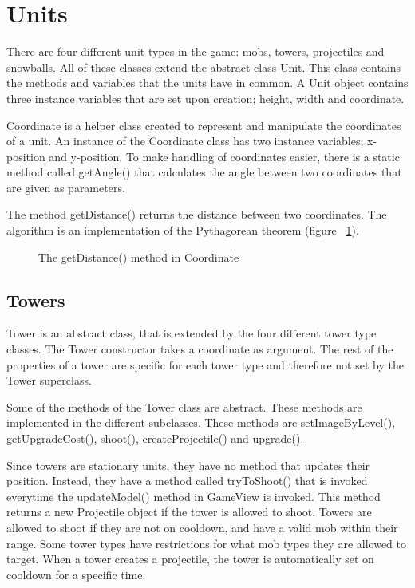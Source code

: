 \section{Units}

There are four different unit types in the game: mobs, towers, projectiles and snowballs. All of these classes extend the abstract class Unit. This class contains the methods and variables that the units have in common. A Unit object contains three instance variables that are set upon creation; height, width and coordinate.

Coordinate is a helper class created to represent and manipulate the coordinates of a unit. An instance of the Coordinate class has two instance variables; x-position and y-position. To make handling of coordinates easier, there is a static method called getAngle() that calculates the angle between two coordinates that are given as parameters.

The method getDistance() returns the distance between two coordinates. The algorithm is an implementation of the Pythagorean theorem (figure ~\ref{fig:codeExGetDistance}).

\begin{figure}[htb]
\begin{small}

\end{small}
\caption{The getDistance() method in Coordinate}
\label{fig:codeExGetDistance}
\end{figure}

\subsection{Towers}

Tower is an abstract class, that is extended by the four different tower type classes. The Tower constructor takes a coordinate as argument. The rest of the properties of a tower are specific for each tower type and therefore not set by the Tower superclass. 

Some of the methods of the Tower class are abstract. These methods are implemented in the different subclasses. These methods are setImageByLevel(), getUpgradeCost(), shoot(), createProjectile() and upgrade(). 

Since towers are stationary units, they have no method that updates their position. Instead, they have a method called tryToShoot() that is invoked everytime the updateModel() method in GameView is invoked. This method returns a new Projectile object if the tower is allowed to shoot. Towers are allowed to shoot if they are not on cooldown, and have a valid mob within their range. Some tower types have restrictions for what mob types they are allowed to target. When a tower creates a projectile, the tower is automatically set on cooldown for a specific time.

